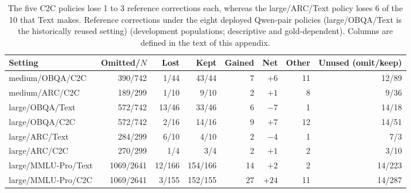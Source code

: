 \begin{table}[h]\centering\footnotesize
\caption{The five C2C policies lose 1 to 3 reference corrections each, whereas the large/ARC/Text policy loses 6 of the 10 that Text makes. Reference corrections under the eight deployed Qwen-pair policies (large/OBQA/Text is the historically reused setting) (development populations; descriptive and gold-dependent). Columns are defined in the text of this appendix.}
\label{tab:omit_keep}
\setlength{\tabcolsep}{4pt}
\begin{tabular}{lrrrrrrr}\toprule
Setting & Omitted/$N$ & Lost & Kept & Gained & Net & Other & Unused (omit/keep)\\\midrule
medium/OBQA/C2C & 390/742 & 1/44 & 43/44 & 7 & $+6$ & 11 & 12/89\\
medium/ARC/C2C & 189/299 & 1/10 & 9/10 & 2 & $+1$ & 8 & 9/36\\
large/OBQA/Text & 572/742 & 13/46 & 33/46 & 6 & $-7$ & 1 & 14/18\\
large/OBQA/C2C & 572/742 & 2/16 & 14/16 & 9 & $+7$ & 12 & 14/51\\
large/ARC/Text & 284/299 & 6/10 & 4/10 & 2 & $-4$ & 1 & 7/3\\
large/ARC/C2C & 270/299 & 1/4 & 3/4 & 2 & $+1$ & 2 & 3/10\\
large/MMLU-Pro/Text & 1069/2641 & 12/166 & 154/166 & 14 & $+2$ & 2 & 14/223\\
large/MMLU-Pro/C2C & 1069/2641 & 3/155 & 152/155 & 27 & $+24$ & 11 & 14/287\\
\bottomrule\end{tabular}
\end{table}
